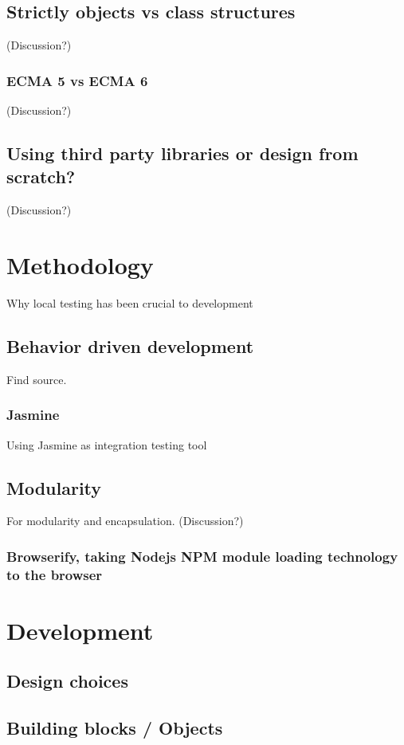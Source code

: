 \documentclass[english]{ifimaster}
\begin{document}
\section{Strictly objects vs class structures} (Discussion?)
\subsection{ECMA 5 vs ECMA 6} (Discussion?)

\section{Using third party libraries or design from scratch?} (Discussion?)

\chapter{Methodology}
Why local testing has been crucial to development 

\section{Behavior driven development}
Find source.

\subsection{Jasmine}
Using Jasmine as integration testing tool

\section{Modularity}
For modularity and encapsulation. (Discussion?)
\subsection{Browserify, taking Nodejs NPM module loading technology to the browser}

\chapter{Development}
\section{Design choices}
\section{Building blocks / Objects}
\end{document}
